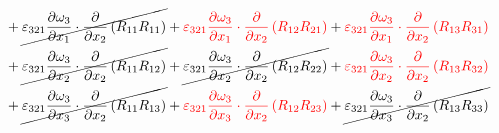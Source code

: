 \begin{equation}
\begin{split}
{}\\ 
		&+\cancel{\varepsilon_{321}\pdv{\omega_{3}}{x_{1}}\cdot\pdv{}{x_{2}}\left(R_{11}R_{11}\right)
}		+{\color{red}\varepsilon_{321}\pdv{\omega_{3}}{x_{1}}\cdot\pdv{}{x_{2}}\left(R_{12}R_{21}\right)
}		+{\color{red}\varepsilon_{321}\pdv{\omega_{3}}{x_{1}}\cdot\pdv{}{x_{2}}\left(R_{13}R_{31}\right)
}\\ 
		&+\cancel{\varepsilon_{321}\pdv{\omega_{3}}{x_{2}}\cdot\pdv{}{x_{2}}\left(R_{11}R_{12}\right)
}		+\cancel{\varepsilon_{321}\pdv{\omega_{3}}{x_{2}}\cdot\pdv{}{x_{2}}\left(R_{12}R_{22}\right)
}		+{\color{red}\varepsilon_{321}\pdv{\omega_{3}}{x_{2}}\cdot\pdv{}{x_{2}}\left(R_{13}R_{32}\right)
}\\ 
		&+\cancel{\varepsilon_{321}\pdv{\omega_{3}}{x_{3}}\cdot\pdv{}{x_{2}}\left(R_{11}R_{13}\right)
}		+{\color{red}\varepsilon_{321}\pdv{\omega_{3}}{x_{3}}\cdot\pdv{}{x_{2}}\left(R_{12}R_{23}\right)
}		+\cancel{\varepsilon_{321}\pdv{\omega_{3}}{x_{3}}\cdot\pdv{}{x_{2}}\left(R_{13}R_{33}\right)
}\\ 
	\end{split}
\end{equation}

